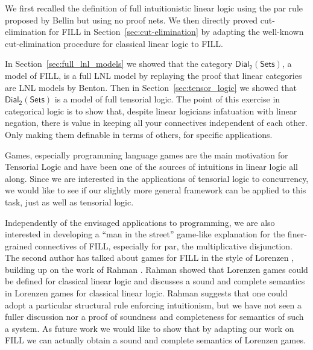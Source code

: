 \documentclass{elsarticle}
\newcommand{\dial}[0]{\mathsf{Dial_2}(\mathsf{Sets})}
\begin{document}
We first recalled the definition of full intuitionistic linear logic using the  par rule proposed by Bellin 
but using
no proof nets.  We then directly proved cut-elimination for FILL in Section~\ref{sec:cut-elimination} by
adapting the well-known cut-elimination procedure for classical linear
logic to FILL.

In Section~\ref{sec:full_lnl_models} we showed that the category
$\dial$, a model of FILL, is a full LNL model by 
replaying the proof that linear
categories are LNL models by Benton. Then in
Section~\ref{sec:tensor_logic} we showed that $\dial$ is a model of full tensorial logic. The point of this exercise in categorical logic
is to show that, despite linear logicians infatuation with linear negation, there is value in keeping all your connectives independent
of each other. Only making them definable in terms of others, for
specific applications.

Games, especially programming language games are the main motivation
for Tensorial Logic and have been one of the sources of intuitions in
linear logic all along. Since we are interested in the applications of
tensorial logic to concurrency, we would like to see if our slightly
more general framework can be applied to this task, just as well as
tensorial logic.

Independently of the envisaged applications to programming, we are
also interested in developing a ``man in the street'' game-like
explanation for the finer-grained connectives of FILL, especially for
par, the multiplicative disjunction. The second author has talked
about games for FILL in the style of Lorenzen \cite{dePaiva:2011},
building up on the work of Rahman
\cite{Keiff:2011,Rahman:2005}. Rahman showed that Lorenzen games could
be defined for classical linear logic \cite{Rahman:2002} and discusses  a sound and complete semantics in Lorenzen games for
classical linear logic. Rahman suggests that one could adopt
a particular structural rule  enforcing intuitionism, but we have not
seen a fuller discussion nor a  proof of soundness and completeness for  semantics of such a system. As future work we would like to show that by adapting our work on FILL  we can actually
obtain a sound and complete semantics of Lorenzen games.

\end{document}
